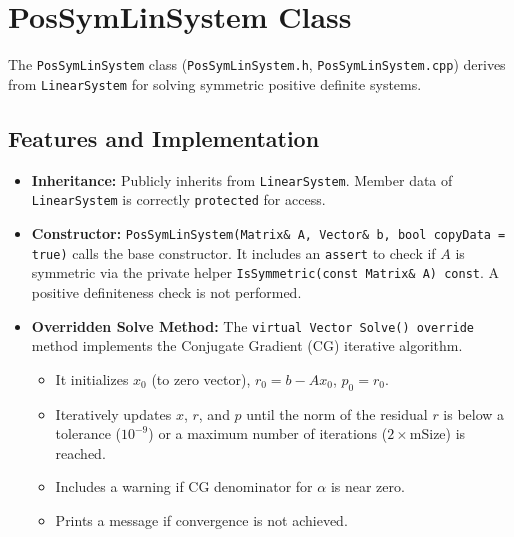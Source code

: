 \section{PosSymLinSystem Class}
\label{sec:possymlinSystem_class}

The \texttt{PosSymLinSystem} class (\texttt{PosSymLinSystem.h}, \texttt{PosSymLinSystem.cpp}) derives from \texttt{LinearSystem} for solving symmetric positive definite systems.

\begin{figure}[H]

\end{figure}

\subsection{Features and Implementation}
\begin{sloppypar}
\begin{itemize}
    \item \textbf{Inheritance:} Publicly inherits from \texttt{LinearSystem}. Member data of \texttt{LinearSystem} is correctly \texttt{protected} for access.
    \item \textbf{Constructor:} \texttt{PosSymLinSystem(Matrix\& A, Vector\& b, bool copyData = true)} calls the base constructor. It includes an \texttt{assert} to check if $A$ is symmetric via the private helper \texttt{IsSymmetric(const Matrix\& A) const}. A positive definiteness check is not performed.
    \item \textbf{Overridden Solve Method:} The \texttt{virtual Vector Solve() override} method implements the Conjugate Gradient (CG) iterative algorithm.
        \begin{itemize}
            \item It initializes $x_0$ (to zero vector), $r_0 = b - Ax_0$, $p_0 = r_0$.
            \item Iteratively updates $x$, $r$, and $p$ until the norm of the residual $r$ is below a tolerance ($10^{-9}$) or a maximum number of iterations ($2 \times \text{mSize}$) is reached.
            \item Includes a warning if CG denominator for $\alpha$ is near zero.
            \item Prints a message if convergence is not achieved.
        \end{itemize}
\end{itemize}
\end{sloppypar}

